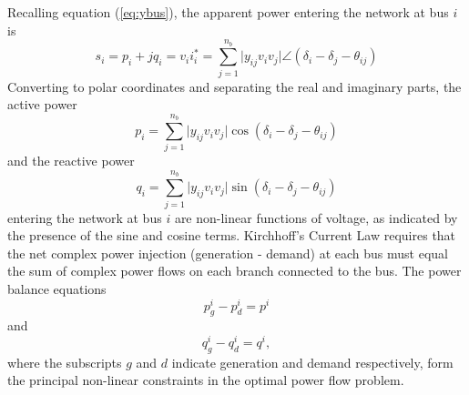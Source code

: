 Recalling equation (\ref{eq:ybus}), the apparent power entering the network at
bus $i$ is
\begin{equation}
s_i = p_i+jq_i = v_i i_i^* = \sum_{j=1}^{n_b} \vert y_{ij}v_i v_j \vert \angle
(\delta_i - \delta_j - \theta_{ij})
\end{equation}
Converting to polar coordinates and separating the real and imaginary parts,
the active power
\begin{equation}
p_i = \sum_{j=1}^{n_b} \vert y_{ij}v_i v_j \vert \cos(\delta_i - \delta_j -
\theta_{ij})
\end{equation}
and the reactive power
\begin{equation}
q_i = \sum_{j=1}^{n_b} \vert y_{ij}v_i v_j \vert \sin(\delta_i - \delta_j -
\theta_{ij})
\end{equation}
entering the network at bus $i$ are non-linear functions of voltage, as
indicated by the presence of the sine and cosine terms.
Kirchhoff's Current Law requires that the net complex power injection
(generation - demand) at each bus must equal the sum of complex power flows on
each branch connected to the bus.  The power balance equations
\begin{equation}
\label{eq:p_balance}
p_g^i - p_d^i = p^i
\end{equation}
and
\begin{equation}
\label{eq:q_balance}
q_g^i - q_d^i = q^i,
\end{equation}
where the subscripts $g$ and $d$ indicate generation and demand
respectively, form the principal non-linear constraints in the optimal power
flow problem.

